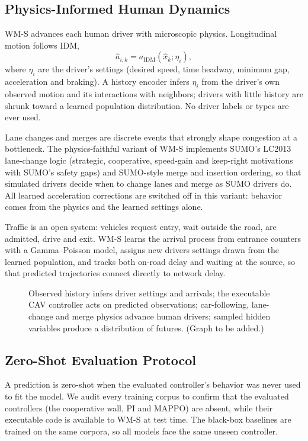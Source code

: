 \documentclass[conference]{IEEEtran}
\newcommand{\graphbox}[1]{\fbox{\parbox[c][0.64in][c]{0.94\columnwidth}{\centering\textcolor{red}{[FIGURE: #1]}}}}
\begin{document}
\subsection{Physics-Informed Human Dynamics}
WM-S advances each human driver with microscopic physics. Longitudinal motion follows IDM,
\begin{equation}
 \hat{a}_{i,k}=a_{\mathrm{IDM}}(\hat{x}_k;\eta_i),
\end{equation}
where $\eta_i$ are the driver's settings (desired speed, time headway, minimum gap, acceleration and braking). A history encoder infers $\eta_i$ from the driver's own observed motion and its interactions with neighbors; drivers with little history are shrunk toward a learned population distribution. No driver labels or types are ever used.

Lane changes and merges are discrete events that strongly shape congestion at a bottleneck. The physics-faithful variant of WM-S implements SUMO's LC2013 lane-change logic (strategic, cooperative, speed-gain and keep-right motivations with SUMO's safety gaps) and SUMO-style merge and insertion ordering, so that simulated drivers decide when to change lanes and merge as SUMO drivers do. All learned acceleration corrections are switched off in this variant: behavior comes from the physics and the learned settings alone. %

Traffic is an open system: vehicles request entry, wait outside the road, are admitted, drive and exit. WM-S learns the arrival process from entrance counters with a Gamma--Poisson model, assigns new drivers settings drawn from the learned population, and tracks both on-road delay and waiting at the source, so that predicted trajectories connect directly to network delay.

\begin{figure}[t]
\centering
\graphbox{WM-S architecture}
\caption{Observed history infers driver settings and arrivals; the executable CAV controller acts on predicted observations; car-following, lane-change and merge physics advance human drivers; sampled hidden variables produce a distribution of futures. (Graph to be added.)}
\label{fig:architecture}
\end{figure}

\subsection{Zero-Shot Evaluation Protocol}
A prediction is zero-shot when the evaluated controller's behavior was never used to fit the model. We audit every training corpus to confirm that the evaluated controllers (the cooperative wall, PI and MAPPO) are absent, while their executable code is available to WM-S at test time. The black-box baselines are trained on the same corpora, so all models face the same unseen controller.
\end{document}
